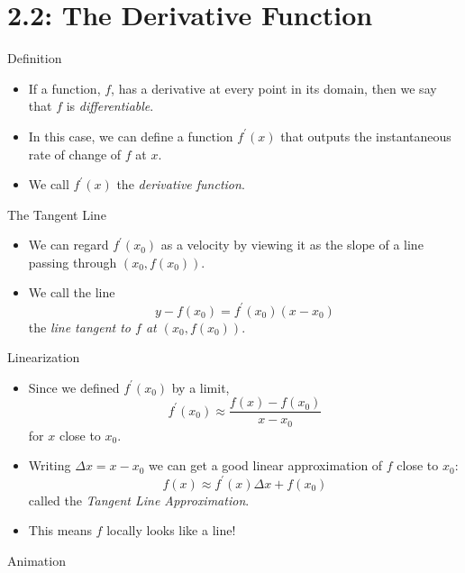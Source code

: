 \documentclass[Lecture.tex]{subfiles}
\begin{document}
\section{2.2: The Derivative Function}
\begin{frame}{Definition}
  \begin{defn}
    \begin{itemize}
    \item<1->
      If a function, $f$, has a derivative at every point in its domain, then we say that $f$ is {\it differentiable}.
    \item<2->
      In this case, we can define a function $f^\prime(x)$ that outputs the instantaneous rate of change of $f$ at $x$.
    \item<3->
      We call $f^\prime(x)$ the {\it derivative function}.
    \end{itemize}
  \end{defn}
\end{frame}

\begin{frame}{The Tangent Line}
  \begin{defn}
    \begin{itemize}
    \item<1->
      We can regard $f^\prime(x_0)$ as a velocity by viewing it as the slope of a line passing through $(x_0,f(x_0))$.
    \item<2->
      We call the line
      $$y - f(x_0) = f^\prime(x_0)(x - x_0)$$
      the {\it line tangent to $f$ at $(x_0, f(x_0))$}.
    \end{itemize}
  \end{defn}
\end{frame}

\begin{frame}{Linearization}
  \begin{itemize}
  \item<1->
    Since we defined $f^\prime(x_0)$ by a limit, 
    $$f^\prime(x_0) \approx \frac{f(x) - f(x_0)}{x - x_0}$$
    for $x$ close to $x_0$.
  \item<2->
    Writing $\Delta x = x - x_0$ we can get a good linear approximation of $f$ close to $x_0$:
    $$f(x) \approx f^\prime(x)\Delta x + f(x_0)$$
    called the {\it Tangent Line Approximation}.
  \item<3->
    This means $f$ locally looks like a line!
  \end{itemize}
\end{frame}

\begin{frame}{Animation}
\end{frame}
\end{document}

